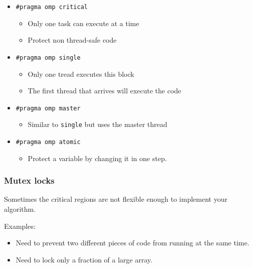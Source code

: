 \begin{itemize}
\itemsep1pt\parskip0pt
\item
  \texttt{\#pragma omp critical}

  \begin{itemize}
  \itemsep1pt\parskip0pt
  \item
    Only one task can execute at a time
  \item
    Protect non thread-safe code
  \end{itemize}
\item
  \texttt{\#pragma omp single}

  \begin{itemize}
  \itemsep1pt\parskip0pt
  \item
    Only one tread executes this block
  \item
    The first thread that arrives will execute the code
  \end{itemize}
\item
  \texttt{\#pragma omp master}

  \begin{itemize}
  \itemsep1pt\parskip0pt
  \item
    Similar to \texttt{single} but uses the master thread
  \end{itemize}
\item
  \texttt{\#pragma omp atomic}

  \begin{itemize}
  \itemsep1pt\parskip0pt
  \item
    Protect a variable by changing it in one step.
  \end{itemize}
\end{itemize}

\subsubsection{Mutex locks}\label{mutex-locks}

Sometimes the critical regions are not flexible enough to implement your
algorithm.

Examples:

\begin{itemize}
\itemsep1pt\parskip0pt
\item
  Need to prevent two different pieces of code from running at the same
  time.
\item
  Need to lock only a fraction of a large array.
\end{itemize}

